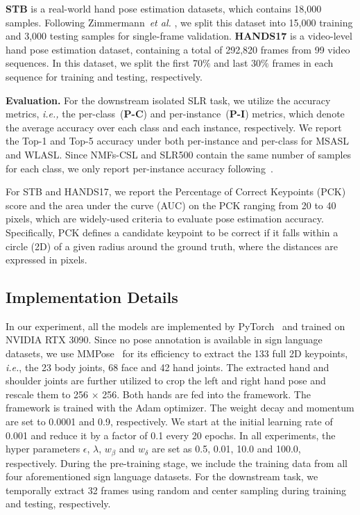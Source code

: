 \documentclass[10pt,twocolumn,letterpaper]{article}
\begin{document}
\textbf{STB} is a real-world hand pose estimation datasets, which contains 18,000 samples. 
Following Zimmermann~\emph{et al.} \cite{zimmermann2017learning}, we split this dataset into 15,000 training and 3,000 testing samples for single-frame validation.
\textbf{HANDS17} is a video-level hand pose estimation dataset, containing a total of 292,820 frames from 99 video sequences. 
In this dataset, we split the first 70$\%$ and last 30$\%$ frames in each sequence for training and testing, respectively.


\noindent
\textbf{Evaluation.} 
For the downstream isolated SLR task, we utilize the accuracy metrics, \emph{i.e.,} the per-class~(\textbf{P-C}) and per-instance~(\textbf{P-I}) metrics, which denote the average accuracy over each class and each instance, respectively. 
We report the Top-1 and Top-5 accuracy under both per-instance and per-class for MSASL and WLASL.
Since NMFs-CSL and SLR500 contain the same number of samples for each class, we only report per-instance accuracy following~\cite{hu2020global, huang2018attention}.

For STB and HANDS17, we report the Percentage of Correct Keypoints (PCK) score and the area under the curve (AUC) on the PCK ranging from 20 to 40 pixels, which are widely-used criteria to evaluate pose estimation accuracy. 
Specifically, PCK defines a candidate keypoint to be correct if it falls within a circle (2D) of a given radius around the ground truth, where the distances are expressed in pixels.


\subsection{Implementation Details}
In our experiment, all the models are implemented by PyTorch~\cite{paszke2019pytorch} and trained on NVIDIA RTX 3090. 
Since no pose annotation is available in sign language datasets, we use MMPose~\cite{mmpose2020} for its efficiency to extract the 133 full 2D keypoints, \textit{i.e.}, the 23 body joints, 68 face and 42 hand joints.
The extracted hand and shoulder joints are further utilized to crop the left and right hand pose and rescale them to 256 $\times$ 256.
Both hands are fed into the framework.
The framework is trained with the Adam optimizer. 
The weight decay and momentum are set to 0.0001 and 0.9, respectively.
We start at the initial learning rate of 0.001 and reduce it by a factor of 0.1 every 20 epochs.
In all experiments, the hyper parameters $\epsilon$, $\lambda$, $w_{\beta}$ and $w_{\delta}$ are set as 0.5, 0.01, 10.0 and 100.0, respectively.
During the pre-training stage, we include the training data from all four aforementioned sign language datasets.
For the downstream task, we temporally extract 32 frames using random and center sampling during training and testing, respectively.
\end{document}
